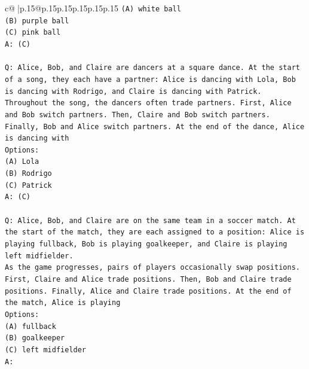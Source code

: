 \documentclass{article}
\begin{document}
{\begin{supertabular}{c@{$\;$}|p{.15\linewidth}@{}p{.15\linewidth}p{.15\linewidth}p{.15\linewidth}p{.15\linewidth}p{.15\linewidth}}
{{{\texttt{(A) white ball} \\
\texttt{(B) purple ball} \\
\texttt{(C) pink ball} \\
\texttt{A: (C)} \\
\\ 
\texttt{Q: Alice, Bob, and Claire are dancers at a square dance. At the start of a song, they each have a partner: Alice is dancing with Lola, Bob is dancing with Rodrigo, and Claire is dancing with Patrick.} \\
\texttt{Throughout the song, the dancers often trade partners. First, Alice and Bob switch partners. Then, Claire and Bob switch partners. Finally, Bob and Alice switch partners. At the end of the dance, Alice is dancing with} \\
\texttt{Options:} \\
\texttt{(A) Lola} \\
\texttt{(B) Rodrigo} \\
\texttt{(C) Patrick} \\
\texttt{A: (C)} \\
\\ 
\texttt{Q: Alice, Bob, and Claire are on the same team in a soccer match. At the start of the match, they are each assigned to a position: Alice is playing fullback, Bob is playing goalkeeper, and Claire is playing left midfielder.} \\
\texttt{As the game progresses, pairs of players occasionally swap positions. First, Claire and Alice trade positions. Then, Bob and Claire trade positions. Finally, Alice and Claire trade positions. At the end of the match, Alice is playing} \\
\texttt{Options:} \\
\texttt{(A) fullback} \\
\texttt{(B) goalkeeper} \\
\texttt{(C) left midfielder} \\
\texttt{A:} \\
            }
        }
    }
     \\ \\


\end{supertabular}}
\end{document}
